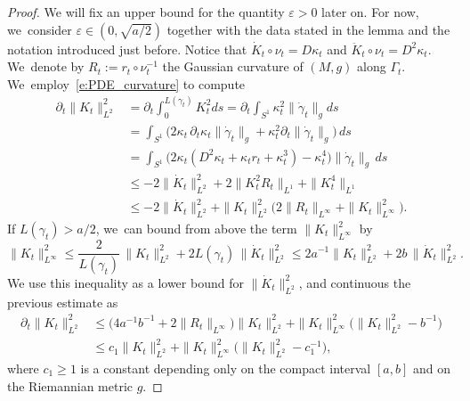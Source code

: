 \documentclass[11pt]{article}
\let\epsilon\varepsilon
\theoremstyle{plain}
\theoremstyle{definition}
\begin{document}
\begin{proof}
We will fix an upper bound for the quantity $\epsilon>0$ later on. For now, we~consider $\epsilon\in(0,\sqrt{a/2})$ together with the data stated in the lemma and the notation introduced just before. Notice that
$\dot K_t\circ\nu_t = D\kappa_t$ and $\ddot K_t\circ \nu_t=D^2\kappa_t$. We~denote by $R_t:=r_t\circ\nu_t^{-1}$ the Gaussian curvature of $(M,g)$ along $\Gamma_t$. We~employ~\eqref{e:PDE_curvature} to compute
\begin{align*}
\partial_t \|K_t\|_{L^2}^2
&=
\partial_t \int_{0}^{L(\gamma_t)}K_t^2 ds
=
\partial_t \int_{S^1}\kappa_t^2\|\dot\gamma_t\|_g ds\\
&=
\int_{S^1}\Big(2\kappa_t\,\partial_t\kappa_t\|\dot\gamma_t\|_g + \kappa_t^2\partial_t\|\dot\gamma_t\|_g\Big)\,ds\\
&=
\int_{S^1}\Big(2\kappa_t(D^2\kappa_t+\kappa_tr_t+\kappa_t^3)- \kappa_t^4\Big)\|\dot\gamma_t\|_g\,ds\\
&\leq
-2 \|\dot K_t\|_{L^2}^2 + 2 \|K_t^2R_t\|_{L^1} + \|K_t^4\|_{L^1}\\
& \leq
-2 \|\dot K_t\|_{L^2}^2 + \|K_t\|_{L^2}^2\Big(2 \|R_t\|_{L^\infty} + \|K_t\|_{L^\infty}^2 \Big).
\end{align*}
If $L(\gamma_t)>a/2$, we~can bound from above the term $\|K_t\|_{L^\infty}^2$ by
\[
\|K_t\|_{L^\infty}^2
\leq \frac2{L(\gamma_t)}\,\|K_t\|_{L^2}^2 + 2L(\gamma_t)\,\|\dot K_t\|_{L^2}^2
\leq 2a^{-1}\|K_t\|_{L^2}^2 + 2b\,\|\dot K_t\|_{L^2}^2 .
\]
We use this inequality as a lower bound for $\|\dot K_t\|_{L^2}^2$, and continuous the previous estimate as
\begin{equation}\label{e:estimate_Kt_L2_Zoll}
\begin{split}
\!\!\!\! \partial_t \|K_t\|_{L^2}^2
&\leq
\big(4a^{-1}b^{-1} + 2\|R_t\|_{L^\infty}\big) \|K_t\|_{L^2}^2 + \|K_t\|_{L^\infty}^2 \bigl(\|K_t\|_{L^2}^2 - b^{-1}\bigr) \\
&\leq
c_1 \|K_t\|_{L^2}^2 + \|K_t\|_{L^\infty}^2 \big(\|K_t\|_{L^2}^2 - c_1^{-1}\big),
\end{split}
\end{equation}
where $c_1\geq1$ is a constant depending only on the compact interval $[a,b]$ and on the Riemannian metric $g$.


\end{proof}
\end{document}
